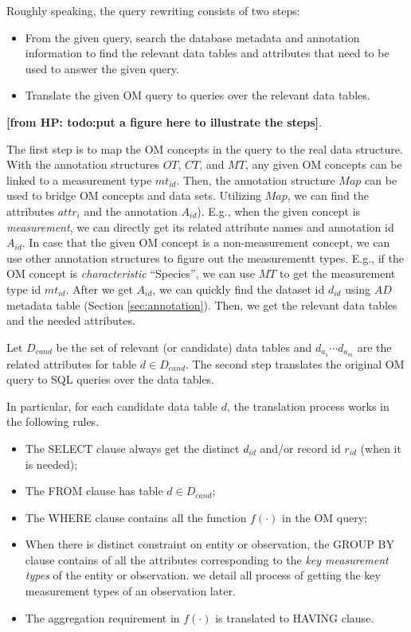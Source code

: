 \documentclass[conference]{IEEEtran}
\newcommand{\from}[2]{{\bf[{\sc from #1:} #2]}}
\begin{document}
Roughly speaking, the query rewriting consists of two steps:
\begin{itemize}
\item From the given query, search the database metadata and
  annotation information to find the relevant data tables and
  attributes that need to be used to answer the given query. 
\item Translate the given OM query to queries over the relevant data
  tables. 
\end{itemize}

\from{HP}{todo:put a figure here to illustrate the steps}. 

The first step is to map the OM concepts in the query to the real data
structure. 
With the annotation structures $OT$, $CT$, and $MT$, any given OM
concepts can be linked to a measurement type $mt_{id}$. 
Then, the annotation structure $Map$ can be used to bridge OM concepts and data sets. 
Utilizing $Map$, we can find the attributes $attr_i$ and the
annotation $A_{id}$).
E.g., when the given concept is {\em measurement}, we can directly get
its related attribute names and annotation id $A_{id}$. 
In case that the given OM concept is a non-measurement concept, we can use
other annotation structures to figure out the measurementt types. 
E.g., if the OM concept is {\em characteristic} ``Species'', we can use
$MT$ to get the measurement type id $mt_{id}$. 
After we get $A_{id}$, we can quickly find the dataset id $d_{id}$
using $AD$ metadata table (Section \ref{sec:annotation}). 
Then, we get the relevant data tables and the needed attributes. 

Let $D_{cand}$ be the set of relevant (or candidate) data tables and $d_{a_1} \cdots d_{a_m}$
are the related attributes for table $d\in D_{cand}$. 
The second step translates the original OM query to SQL queries over the data tables.  

In particular, for each candidate data table $d$,  
the translation process works in the following rules. 

\begin{itemize}
\item The SELECT clause always get the distinct $d_{id}$ and/or
  record id $r_{id}$ (when it is needed);
\item The FROM clause has table $d \in D_{cand}$;
\item The WHERE clause contains all the function $f(\cdot)$ in the OM
  query;
\item When there is distinct constraint on entity or observation, the
  GROUP BY clause contains of all the attributes corresponding to the
  {\em key measurement types} of the entity or observation. we detail
  all process of getting the key measurement types of an observation
  later. 
\item The aggregation requirement in $f(\cdot)$ is translated to
  HAVING clause. 
\end{itemize}
\end{document}
